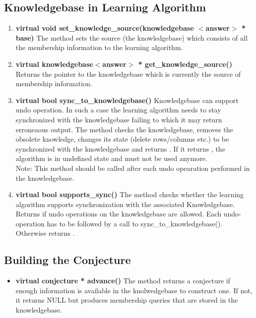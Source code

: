\subsection*{Knowledgebase in Learning Algorithm}

\begin{enumerate}

 \item \textbf{virtual void set\_knowledge\_source(knowledgebase $<$answer$>$ * base)} \vskip 1pt
	The method sets the source (the knowledgebase) which consists of all the membership information to the learning algorithm.

 \item \textbf{virtual knowledgebase$<$answer$>$ * get\_knowledge\_source()} \vskip 1pt
	Returns the pointer to the knowledgebase which is currently the source of membership information.

 \item \textbf{virtual bool sync\_to\_knowledgebase()} \vskip 1pt
	Knowledgebase can support undo operation. In such a case the learning algorithm needs to stay synchronized with the knowledgebase failing to which it may return erroneaous output. The method checks the knowledgebase, removes the obsolete knowledge, changes its state (delete rows/columns etc.) to be synchronized with the knowledgebase and returns \true. If it returns \false, the algorithm is in undefined state and must not be used anymore. \\
	Note: This method should be called after each undo opearation performed in the knowledgebase.

 \item \textbf{virtual bool supports\_sync()} \vskip 1pt
	The method checks whether the learning algorithm supports synchronization with the associated Knowledgebase. Returns \true if undo operations on the knowledgebase are allowed. Each undo-operation has to be followed by a call to sync\_to\_knowledgebase(). Otherwise returns \false.

\end{enumerate}


\subsection*{Building the Conjecture}

\begin{itemize}
 \item \textbf{virtual conjecture * advance()} \vskip 1pt
	The method returns a conjecture if enough information is available in the knolwedgebase to construct one. If not, it returns NULL but produces membership queries that are stored in the knowledgebase.
\end{itemize}

